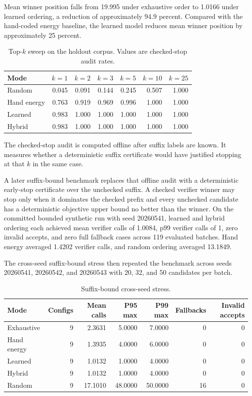 \documentclass[11pt]{article}
\begin{document}
Mean winner position falls from 19.995 under exhaustive order to 1.0166 under
learned ordering, a reduction of approximately 94.9 percent. Compared with the
hand-coded energy baseline, the learned model reduces mean winner position by
approximately 25 percent.

\begin{table}[h]
\centering
\caption{Top-$k$ sweep on the holdout corpus. Values are checked-stop audit rates.}
\begin{tabular}{lrrrrrr}
\toprule
Mode & $k=1$ & $k=2$ & $k=3$ & $k=5$ & $k=10$ & $k=25$ \\
\midrule
Random & 0.045 & 0.091 & 0.144 & 0.245 & 0.507 & 1.000 \\
Hand energy & 0.763 & 0.919 & 0.969 & 0.996 & 1.000 & 1.000 \\
Learned & 0.983 & 1.000 & 1.000 & 1.000 & 1.000 & 1.000 \\
Hybrid & 0.983 & 1.000 & 1.000 & 1.000 & 1.000 & 1.000 \\
\bottomrule
\end{tabular}
\end{table}

The checked-stop audit is computed offline after suffix labels are known. It
measures whether a deterministic suffix certificate would have justified
stopping at that $k$ in the same case.

A later suffix-bound benchmark replaces that offline audit with a deterministic
early-stop certificate over the unchecked suffix. A checked verifier winner may
stop only when it dominates the checked prefix and every unchecked candidate has
a deterministic objective upper bound no better than the winner. On the
committed bounded synthetic run with seed 20260541, learned and hybrid ordering
each achieved mean verifier calls of 1.0084, p99 verifier calls of 1, zero
invalid accepts, and zero full fallback cases across 119 evaluated batches.
Hand energy averaged 1.4202 verifier calls, and random ordering averaged
13.1849.

The cross-seed suffix-bound stress then repeated the benchmark across seeds
20260541, 20260542, and 20260543 with 20, 32, and 50 candidates per batch.

\begin{table}[h]
\centering
\caption{Suffix-bound cross-seed stress.}
\begin{tabular}{lrrrrrr}
\toprule
Mode & Configs & Mean calls & P95 max & P99 max & Fallbacks & Invalid accepts \\
\midrule
Exhaustive & 9 & 2.3631 & 5.0000 & 7.0000 & 0 & 0 \\
Hand energy & 9 & 1.3935 & 4.0000 & 6.0000 & 0 & 0 \\
Learned & 9 & 1.0132 & 1.0000 & 4.0000 & 0 & 0 \\
Hybrid & 9 & 1.0132 & 1.0000 & 4.0000 & 0 & 0 \\
Random & 9 & 17.1010 & 48.0000 & 50.0000 & 16 & 0 \\
\bottomrule
\end{tabular}
\end{table}
\end{document}
